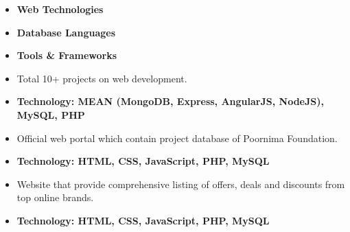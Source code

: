 \documentclass[10pt,a4paper,ragged2e]{altacv}
\begin{document}
\smallskip
\divider
\smallskip



\begin{itemize}
\item\bf{Web Technologies}
\item\bf{Database Languages}
\item\bf{Tools \& Frameworks}
\end{itemize}


\begin{itemize}
\item Total 10+ projects on web development.
\item\bf{Technology}{: MEAN (MongoDB, Express, AngularJS, NodeJS), MySQL, PHP}
\end{itemize}
\smallskip

\begin{itemize}
\item Official web portal which contain project database of Poornima Foundation.
\item\bf{Technology}{: HTML, CSS, JavaScript, PHP, MySQL}
\end{itemize}
\smallskip

\begin{itemize}
\item Website that provide comprehensive listing of offers, deals and discounts from top online brands.
\item\bf{Technology}{: HTML, CSS, JavaScript, PHP, MySQL}
\end{itemize}
\smallskip
\end{document}
